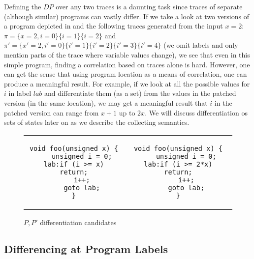 Defining the $DP$ over any two traces is a daunting task since traces of separate (although similar) programs can vastly differ. If we take a look at two versions of a program depicted in  and the following traces generated from the input $x=2$: $\pi = \{x=2,i=0 \}\{i=1 \}\{i=2 \}$ and $\pi' = \{ x'=2,i'=0 \}\{ i'=1 \}\{ i'=2 \}\{ i'=3 \}\{i'=4\}$ (we omit labels and only mention parts of the trace where variable values change), we see that even in this simple program, finding a correlation based on traces alone is hard. However, one can get the sense that using program location as a means of correlation, one can produce a meaningful result. For example, if we look at all the possible values for $i$ in label $lab$ and differentiate them (as a set) from the values in the patched version (in the same location), we may get a meaningful result that $i$ in the patched version can range from $x+1$ up to $2x$. We will discuss differentiation os sets of states later on as we describe the collecting semantics.

\begin{figure}
\begin{tabular}{cc}
\centering
\begin{lstlisting}
void foo(unsigned x) {
    unsigned i = 0;
lab:if (i >= x) return;
    i++;
    goto lab;
}
\end{lstlisting}
&
\begin{lstlisting}
void foo(unsigned x) {
    unsigned i = 0;
lab:if (i >= 2*x) return;
    i++;
    goto lab;
}
\end{lstlisting}
\end{tabular}
\caption{$P,P'$ differentiation candidates}
\end{figure}

\subsection{Differencing at Program Labels} 

